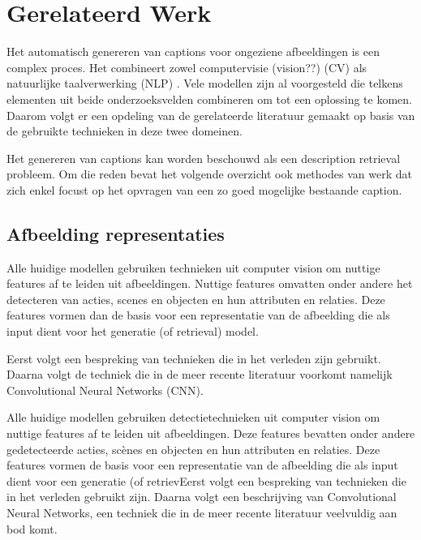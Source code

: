 \chapter{Gerelateerd Werk}
\label{hoofdstuk:related}
Het automatisch genereren van captions voor ongeziene afbeeldingen is een complex proces. Het combineert zowel computervisie (vision??) (CV) als natuurlijke taalverwerking (NLP) . Vele modellen zijn al voorgesteld die telkens elementen uit beide onderzoeksvelden combineren om tot een oplossing te komen. Daarom volgt er een opdeling van de gerelateerde literatuur gemaakt op basis van de gebruikte technieken in deze twee domeinen. 

Het genereren van captions kan worden beschouwd als een description retrieval probleem.\cite{Hodosh2013}  Om die reden bevat het volgende overzicht ook methodes van werk dat zich enkel focust op het opvragen van een zo goed mogelijke bestaande caption.

\section{Afbeelding representaties}
Alle huidige modellen gebruiken technieken uit computer vision om nuttige features af te leiden uit afbeeldingen. Nuttige features omvatten onder andere het detecteren van acties, scenes en objecten en hun attributen en relaties. \cite{Bernardi}  Deze features vormen dan de basis voor een representatie van de afbeelding die als input dient voor het generatie (of retrieval) model. 

Eerst volgt een bespreking van technieken die in het verleden zijn gebruikt. Daarna volgt de techniek die in de meer recente literatuur voorkomt namelijk Convolutional Neural Networks (CNN).

Alle huidige modellen gebruiken detectietechnieken uit computer vision om nuttige features af te leiden uit afbeeldingen. Deze features bevatten onder andere gedetecteerde acties, sc\`enes en objecten en hun attributen en relaties. Deze features vormen de basis voor een representatie van de afbeelding die als input dient voor een generatie (of retrievEerst volgt een bespreking van technieken die in het verleden gebruikt zijn. Daarna volgt een beschrijving van Convolutional Neural Networks, een techniek die in de meer recente literatuur veelvuldig aan bod komt.

